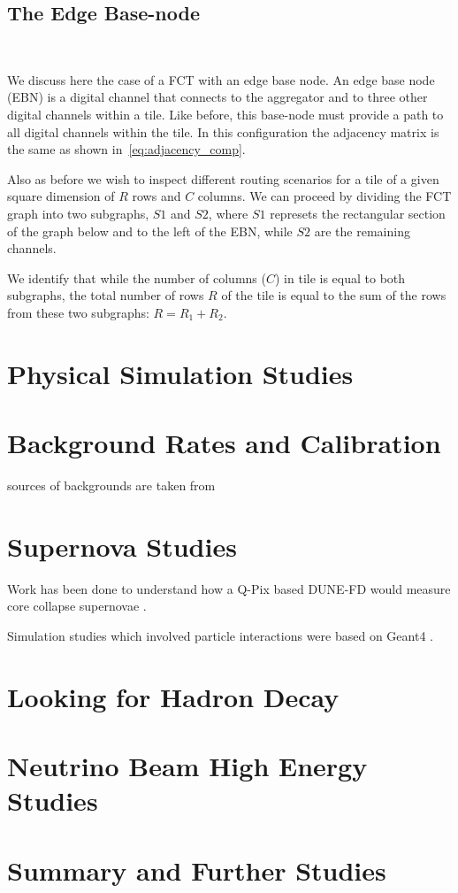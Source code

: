 \subsection{The Edge Base-node}~\label{sec:base_node}

We discuss here the case of a FCT with an edge base node.
An edge base node (EBN) is a digital channel that connects to the aggregator and to three other digital channels within a tile.
Like before, this base-node must provide a path to all digital channels within the tile.
In this configuration the adjacency matrix is the same as shown in~\ref{eq:adjacency_comp}.

Also as before we wish to inspect different routing scenarios for a tile of a given square dimension of $R$ rows and $C$ columns.
We can proceed by dividing the FCT graph into two subgraphs, $S1$ and $S2$, where $S1$ represets the rectangular section of the graph below and to the left of the EBN, while $S2$ are the remaining channels.

We identify that while the number of columns ($C$) in tile is equal to both subgraphs, the total number of rows $R$ of the tile is equal to the sum of the rows from these two subgraphs: $R = R_{1} + R_{2}$.



\section{Physical Simulation Studies}

\section{Background Rates and Calibration}

sources of backgrounds are taken from \citep{DUNE-FD_TDRv4:Abi_2020}

\section{Supernova Studies}

Work has been done to understand how a Q-Pix based DUNE-FD would measure core collapse supernovae \citep{qpix:shion}.

Simulation studies which involved particle interactions were based on Geant4 \citep{geant4:AGOSTINELLI2003250}.


\section{Looking for Hadron Decay}

\section{Neutrino Beam High Energy Studies}

\section{Summary and Further Studies}
